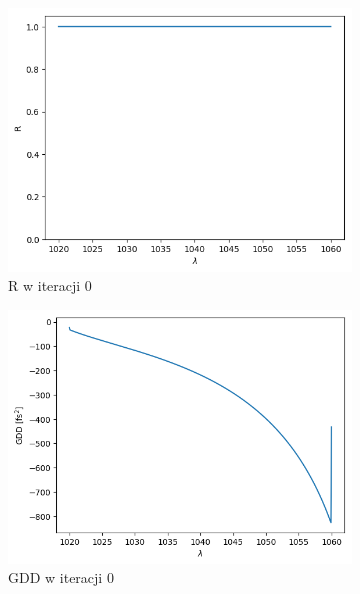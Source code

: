 \begin{figure} [H]
    \centering
    \begin{subfigure}[b]{0.30\textwidth}
        \includegraphics[width=\linewidth]{figures/wyniki/2stopien/result_Rresult0.png}
        \caption{R w iteracji 0}
    \end{subfigure}
            \begin{subfigure}[b]{0.31\textwidth}
        \includegraphics[width=\linewidth]{figures/wyniki/2stopien/result_gddresult0.png}
        \caption{GDD w iteracji 0}
    \end{subfigure}
        \begin{subfigure}[b]{0.32\textwidth}

\end{subfigure}
\end{figure}
